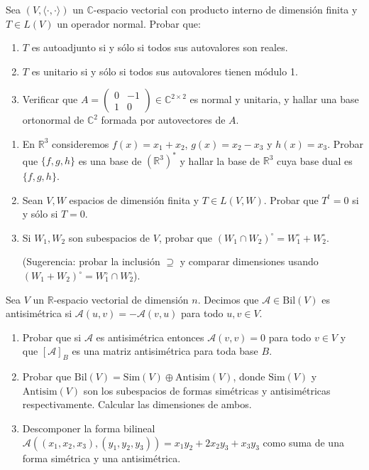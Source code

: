 \documentclass{article}
\newcommand{\R}{\mathbb{R}}
\newcommand{\C}{\mathbb{C}}
\newcommand{\ip}[2]{\langle #1, #2\rangle}
\newcommand{\A}{\mathcal{A}}
\newenvironment{ejercicio}[1]{\begin{trivlist}
\item[\hskip \labelsep {\bfseries #1.}]}{\end{trivlist}}
\begin{document}
\begin{ejercicio}{3}
    Sea \( (V, \ip{\cdot}{\cdot}) \) un \( \C \)-espacio vectorial con producto interno de dimensión finita y \( T \in L(V) \) un operador normal. Probar que:
    \begin{enumerate}
        \item \( T \) es autoadjunto si y sólo si todos sus autovalores son reales.
        \item \( T \) es unitario si y sólo si todos sus autovalores tienen módulo 1.
        \item Verificar que \( A = \begin{pmatrix} 0 & -1 \\ 1 & 0 \end{pmatrix} \in \C^{2 \times 2} \) es normal y unitaria, y hallar una base ortonormal de \( \C^2 \) formada por autovectores de \( A \).
    \end{enumerate}
\end{ejercicio}

\begin{ejercicio}{4}
    \begin{enumerate}
        \item En \( \R^3 \) consideremos \( f(x) = x_1 + x_2 \), \( g(x) = x_2 - x_3 \) y \( h(x) = x_3 \). Probar que \( \{f, g, h\} \) es una base de \( (\R^3)^* \) y hallar la base de \( \R^3 \) cuya base dual es \( \{f, g, h\} \).
        \item Sean \( V, W \) espacios de dimensión finita y \( T \in L(V, W) \). Probar que \( T^t = 0 \) si y sólo si \( T = 0 \).
        \item Si \( W_1, W_2 \) son subespacios de \( V \), probar que \( (W_1 \cap W_2)^\circ = W_1^\circ + W_2^\circ \).

              (Sugerencia: probar la inclusión \( \supseteq \) y comparar dimensiones usando \( (W_1 + W_2)^\circ = W_1^\circ \cap W_2^\circ \)).
    \end{enumerate}
\end{ejercicio}

\begin{ejercicio}{5}
    Sea \( V \) un \( \R \)-espacio vectorial de dimensión \( n \). Decimos que \( \A \in \mathrm{Bil}(V) \) es antisimétrica si \( \A(u, v) = -\A(v, u) \) para todo \( u, v \in V \).
    \begin{enumerate}
        \item Probar que si \( \A \) es antisimétrica entonces \( \A(v, v) = 0 \) para todo \( v \in V \) y que \( [\A]_B \) es una matriz antisimétrica para toda base \( B \).
        \item Probar que \( \mathrm{Bil}(V) = \mathrm{Sim}(V) \oplus \mathrm{Antisim}(V) \), donde \( \mathrm{Sim}(V) \) y \( \mathrm{Antisim}(V) \) son los subespacios de formas simétricas y antisimétricas respectivamente. Calcular las dimensiones de ambos.
        \item Descomponer la forma bilineal \( \A((x_1, x_2, x_3), (y_1, y_2, y_3)) = x_1 y_2 + 2 x_2 y_3 + x_3 y_3 \) como suma de una forma simétrica y una antisimétrica.
    \end{enumerate}
\end{ejercicio}
\end{document}
